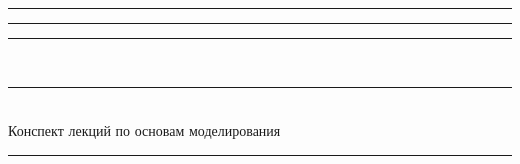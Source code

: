 \documentclass[12pt,notitlepage,pscyr]{hedlectures}
\begin{document}
  \begin{titlepage}
    \vspace*{\fill}
    \center
    \Large
    \rule[.5ex]{8em}{.5pt} \decothreeleft \rule{1em}{0pt}
    \decosix \rule{1em}{0pt}
    \decothreeright\ \rule[.5ex]{8em}{.5pt} \\[2ex]
    
    Конспект лекций по основам моделирования \\[1.5ex]
    
    \rule{22.2em}{.5pt}
    \vspace*{\fill}
  \end{titlepage}
  
  
\end{document}
